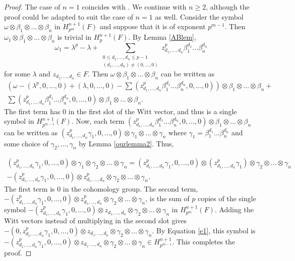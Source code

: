\documentclass[preprint, 10pt, english]{elsarticle}
\theoremstyle{definition}
\renewcommand{\geq}{\geqslant}
\renewcommand{\leq}{\leqslant}
\begin{document}
\begin{proof}
The case of $n=1$ coincides with \cite[Proposition 5]{MammoneMerkurjev:1991}. We continue with $n\geq 2$, although the proof could be adapted to suit the case of $n=1$ as well.
Consider the symbol $\omega \otimes \beta_1 \otimes \dots \otimes \beta_n$ in $H_{p^m}^{n+1}(F)$ and suppose that it is of exponent $p^{m-1}$.
Then $\omega_1 \otimes \beta_1 \otimes \dots \otimes \beta_n$ is trivial in $H_p^{n+1}(F)$.
By Lemma \ref{ABlem}, $$\omega_1=\lambda^p-\lambda+\sum_{\begin{matrix}0\leq d_1,\dots,d_n \leq p-1\\ (d_1,\dots,d_n)\neq (0,\dots,0)\end{matrix}} z_{d_1,\dots,d_n}^p \beta_1^{d_1} \dots \beta_n^{d_n}$$ for some $\lambda$ and $z_{d_1,\dots,d_n} \in F$.
Then $\omega \otimes \beta_1 \otimes \dots \otimes \beta_n$ can be written as 
\begin{eqnarray*}
\left(\omega-(\lambda^p,0,\dots,0)+(\lambda,0,\dots,0)-\sum (z_{d_1,\dots,d_n}^p \beta_1^{d_1}\dots \beta_n^{d_n},0,\dots,0)\right) \otimes \beta_1 \otimes \dots \otimes \beta_n+\\
\sum (z_{d_1,\dots,d_n}^p \beta_1^{d_1}\dots \beta_n^{d_n},0,\dots,0) \otimes \beta_1 \otimes \dots \otimes \beta_n.
\end{eqnarray*}
The first term has 0 in the first slot of the Witt vector, and thus is a single symbol in $H_{p^{m-1}}^{n+1}(F)$.
Now, each term $(z_{d_1,\dots,d_n}^p \beta_1^{d_1}\dots \beta_n^{d_n},0,\dots,0) \otimes \beta_1 \otimes \dots \otimes \beta_n$ can be written as
$(z_{d_1,\dots,d_n}^p \gamma_1,0,\dots,0) \otimes \gamma_1 \otimes \dots \otimes \gamma_n$ where $\gamma_1=\beta_1^{d_1}\dots \beta_n^{d_n}$ and some choice of $\gamma_2,\dots,\gamma_n$ by Lemma \ref{ourlemma2}. Thus, 

\begin{multline*}
(z_{d_1,\dots,d_n}^p \gamma_1,0,\dots,0) \otimes \gamma_1 \otimes \gamma_2 \otimes\dots \otimes \gamma_n=(z_{d_1,\dots,d_n}^p \gamma_1,0,\dots,0) \otimes (z_{d_1,\dots,d_n}^p \gamma_1) \otimes \gamma_2 \otimes \dots \otimes \gamma_n\\
-(z_{d_1,\dots,d_n}^p \gamma_1,0,\dots,0) \otimes z_{d_1,\dots,d_n}^p \otimes \gamma_2 \otimes \dots \otimes \gamma_n. 
\end{multline*}
The first term is 0 in the cohomology group. The second term, $-(z_{d_1,\dots,d_n}^p \gamma_1,0,\dots,0) \otimes z_{d_1,\dots,d_n}^p \otimes \gamma_2 \otimes \dots \otimes \gamma_n$, is the sum of $p$ copies of the single symbol $-(z_{d_1,\dots,d_n}^p \gamma_1,0,\dots,0) \otimes z_{d_1,\dots,d_n} \otimes \gamma_2 \otimes \dots \otimes \gamma_n$ in $H_{p^{m}}^{n+1}(F)$. Adding the Witt vectors instead of multiplying in the second slot gives $-(0, z_{d_1,\dots,d_n}^p \gamma_1,0,\ldots,0)\otimes z_{d_1,\dots,d_n} \otimes \gamma_2 \otimes \dots \otimes \gamma_n$. By Equation \ref{e1}, this symbol is $-(z_{d_1,\dots,d_n}^p \gamma_1,0,\ldots,0)\otimes z_{d_1,\dots,d_n} \otimes \gamma_2 \otimes \dots \otimes \gamma_n\in H^{n+1}_{p^{m-1}}$. This completes the proof.
\end{proof}
\end{document}
